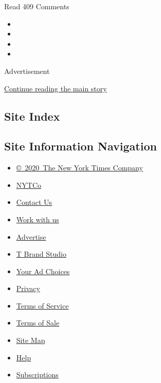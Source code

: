 Read 409 Comments

\begin{itemize}
\item
\item
\item
\item
\end{itemize}

Advertisement

\protect\hyperlink{after-bottom}{Continue reading the main story}

\hypertarget{site-index}{%
\subsection{Site Index}\label{site-index}}

\hypertarget{site-information-navigation}{%
\subsection{Site Information
Navigation}\label{site-information-navigation}}

\begin{itemize}
\tightlist
\item
  \href{https://help.nytimes3xbfgragh.onion/hc/en-us/articles/115014792127-Copyright-notice}{©~2020~The
  New York Times Company}
\end{itemize}

\begin{itemize}
\tightlist
\item
  \href{https://www.nytco.com/}{NYTCo}
\item
  \href{https://help.nytimes3xbfgragh.onion/hc/en-us/articles/115015385887-Contact-Us}{Contact
  Us}
\item
  \href{https://www.nytco.com/careers/}{Work with us}
\item
  \href{https://nytmediakit.com/}{Advertise}
\item
  \href{http://www.tbrandstudio.com/}{T Brand Studio}
\item
  \href{https://www.nytimes3xbfgragh.onion/privacy/cookie-policy\#how-do-i-manage-trackers}{Your
  Ad Choices}
\item
  \href{https://www.nytimes3xbfgragh.onion/privacy}{Privacy}
\item
  \href{https://help.nytimes3xbfgragh.onion/hc/en-us/articles/115014893428-Terms-of-service}{Terms
  of Service}
\item
  \href{https://help.nytimes3xbfgragh.onion/hc/en-us/articles/115014893968-Terms-of-sale}{Terms
  of Sale}
\item
  \href{https://spiderbites.nytimes3xbfgragh.onion}{Site Map}
\item
  \href{https://help.nytimes3xbfgragh.onion/hc/en-us}{Help}
\item
  \href{https://www.nytimes3xbfgragh.onion/subscription?campaignId=37WXW}{Subscriptions}
\end{itemize}
